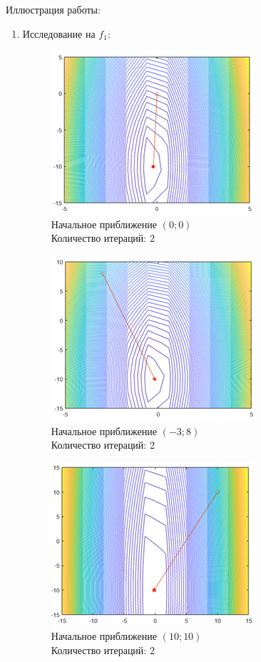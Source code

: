 \documentclass[12pt]{article}
\begin{document}
Иллюстрация работы:
\begin{enumerate}
	\item Исследование на $f_1$:

	\begin{figure}[H]
    	\centering
    	\includegraphics[]{img/f1_2_1.png}
    	\\ Начальное приближение $\left( 0; 0 \right)$
    	\\ Количество итераций: 2
    \end{figure}

	\begin{figure}[H]
    	\centering
    	\includegraphics[]{img/f1_2_2.png}
    	\\ Начальное приближение $\left( -3; 8 \right)$
    	\\ Количество итераций: 2
    \end{figure}

	\begin{figure}[H]
    	\centering
    	\includegraphics[]{img/f1_2_3.png}
    	\\ Начальное приближение $\left( 10; 10 \right)$
    	\\ Количество итераций: 2
    \end{figure}


\end{enumerate}
\end{document}
